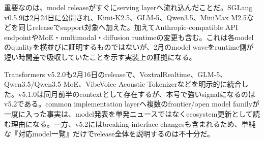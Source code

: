 重要なのは、model releaseがすぐにserving layerへ流れ込んだことだ。SGLang v0.5.9は2月24日に公開され、Kimi-K2.5、GLM-5、Qwen3.5、MiniMax M2.5などを同じreleaseでsupport対象へ加えた。加えてAnthropic-compatible API endpointやMoE・multimodal・diffusion runtimeの変更も含む。これは各modelのqualityを横並びに証明するものではないが、2月のmodel waveをruntime側が短い時間差で吸収していたことを示す実装上の証拠になる。\autocite{src-5bc0746a47c6}


Transformers v5.2.0も2月16日のreleaseで、VoxtralRealtime、GLM-5、Qwen3.5/Qwen3.5 MoE、VibeVoice Acoustic Tokenizerなどを明示的に統合した。v5.1.0は同月前半のcontextとして存在するが、本号で強いsignalになるのはv5.2である。common implementation layerへ複数のfrontier/open model familyが一度に入った事実は、model発表を単発ニュースではなくecosystem更新として読む理由になる。一方、v5.2にはbreaking interface changesも含まれるため、単純な『対応model一覧』だけでrelease全体を説明するのは不十分だ。\autocite{src-0bd04783f97b,src-a43d64987293}


